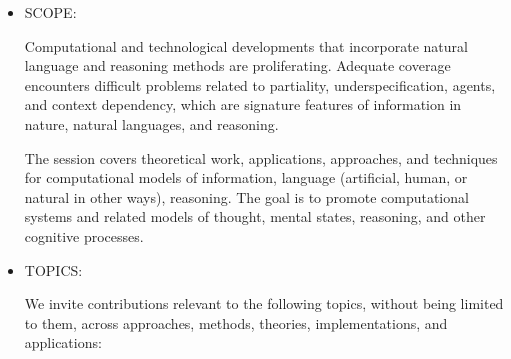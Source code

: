 \documentclass[prodmode,acmtecs]{acmsmall} %
\begin{document}
\begin{itemize}\item  SCOPE: 
 
  Computational and technological developments that incorporate natural language and reasoning methods are proliferating. Adequate coverage encounters difficult problems related to partiality, underspecification, agents, and context dependency, which are signature features of information in nature, natural languages, and reasoning. 
 
  The session covers theoretical work, applications, approaches, and techniques for computational models of information, language (artificial, human, or natural in other ways), reasoning. The goal is to promote computational systems and related models of thought, mental states, reasoning, and other cognitive processes. 
 
\item  TOPICS: 
 
  We invite contributions relevant to the following topics, without being limited to them, across approaches, methods, theories, implementations, and applications: 
 

\end{itemize}
\end{document}
